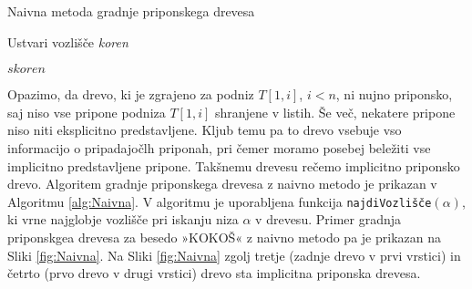 \begin{algorithm}[htb]

    \caption{Naivna metoda gradnje priponskega drevesa}\label{alg:Naivna}
    {
        {Ustvari vozlišče \textit{koren}}
        
        {$s \textit{koren}$}
        
        
    }
\end{algorithm}

Opazimo, da drevo, ki je zgrajeno za podniz $T[1,i]$, $i< n$, ni nujno priponsko, saj niso vse pripone podniza $T[1,i]$ shranjene v listih. Še več, nekatere pripone niso niti eksplicitno predstavljene. Kljub temu pa to drevo vsebuje vso informacijo o pripadajočlh priponah, pri čemer moramo posebej beležiti vse implicitno predstavljene pripone. Takšnemu drevesu rečemo implicitno priponsko drevo. Algoritem gradnje priponskega drevesa z naivno metodo je prikazan v Algoritmu \ref{alg:Naivna}. V algoritmu je uporabljena funkcija \texttt{najdiVozlišče}$(\alpha)$, ki vrne najglobje vozlišče pri iskanju niza $\alpha$ v drevesu. Primer gradnja priponskgea drevesa za besedo »KOKOŠ« z naivno metodo pa je prikazan na Sliki \ref{fig:Naivna}. Na Sliki \ref{fig:Naivna} zgolj tretje (zadnje drevo v prvi vrstici) in četrto (prvo drevo v drugi vrstici) drevo sta implicitna priponska drevesa.

